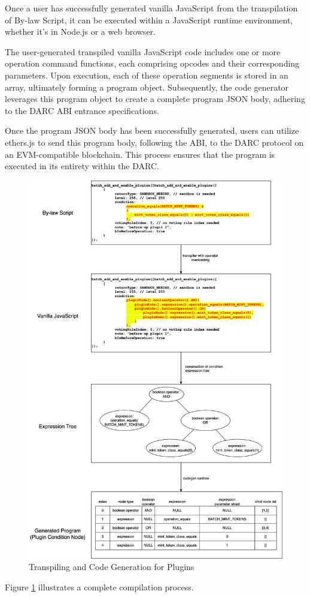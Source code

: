 \documentclass[main.tex]{subfiles}
\begin{document}
Once a user has successfully generated vanilla JavaScript from the transpilation of By-law Script, it can be executed within a JavaScript runtime environment, whether it's in Node.js or a web browser.

The user-generated transpiled vanilla JavaScript code includes one or more operation command functions, each comprising opcodes and their corresponding parameters. Upon execution, each of these operation segments is stored in an array, ultimately forming a program object. Subsequently, the code generator leverages this program object to create a complete program JSON body, adhering to the DARC ABI entrance specifications.

Once the program JSON body has been successfully generated, users can utilize ethers.js to send this program body, following the ABI, to the DARC protocol on an EVM-compatible blockchain. This process ensures that the program is executed in its entirety within the DARC.

\begin{figure}
\centering
\includegraphics[width=1\linewidth]{by-law-script-process.drawio.png}
\caption{\label{fig:by-law-plugin}Transpiling and Code Generation for Plugins}
\end{figure}

Figure \ref{fig:by-law-plugin} illustrates a complete compilation process. 
\end{document}
